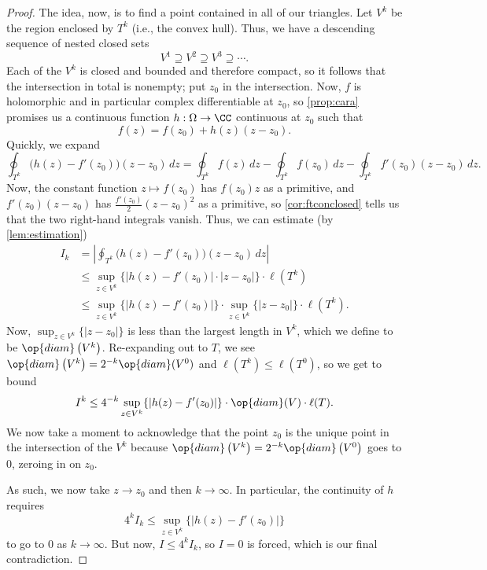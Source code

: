 \begin{proof}
	The idea, now, is to find a point contained in all of our triangles. Let $V^k$ be the region enclosed by $T^k$ (i.e., the convex hull). Thus, we have a descending sequence of nested closed sets
	\[V^1\supseteq V^2\supseteq V^3\supseteq\cdots.\]
	Each of the $V^k$ is closed and bounded and therefore compact, so it follows that %
	the intersection in total is nonempty; put $z_0$ in the intersection. Now, $f$ is holomorphic and in particular complex differentiable at $z_0$, so \autoref{prop:cara} promises us a continuous function $h:\Omega\to\CC$ continuous at $z_0$ such that
	\[f(z)=f(z_0)+h(z)(z-z_0).\]
	Quickly, we expand
	\[\oint_{T^k}\big(h(z)-f'(z_0)\big)(z-z_0)\,dz=\oint_{T^k}f(z)\,dz-\oint_{T^k}f(z_0)\,dz-\oint_{T^k}f'(z_0)(z-z_0)\,dz.\]
	Now, the constant function $z\mapsto f(z_0)$ has $f(z_0)z$ as a primitive, and $f'(z_0)(z-z_0)$ has $\frac{f'(z_0)}2(z-z_0)^2$ as a primitive, so \autoref{cor:ftconclosed} tells us that the two right-hand integrals vanish. Thus, we can estimate (by \autoref{lem:estimation})
	\begin{align*}
		I_k &= \left|\oint_{T^k}\big(h(z)-f'(z_0)\big)(z-z_0)\,dz\right| \\
		&\le \sup_{z\in V^k}\{|h(z)-f'(z_0)|\cdot|z-z_0|\}\cdot\ell\left(T^k\right) \\
		&\le \sup_{z\in V^k}\{|h(z)-f'(z_0)|\} \cdot\sup_{z\in V^k}\{|z-z_0|\}\cdot\ell\left(T^k\right).
	\end{align*}
	Now, $\sup_{z\in V^k}\{|z-z_0|\}$ is less than the largest length in $V^k$, which we define to be $\op{diam}\left(V^k\right)$. Re-expanding out to $T$, we see $\op{diam}\left(V^k\right)=2^{-k}\op{diam}(V^0)$ and $\ell\left(T^k\right)\le\ell(T^0)$, so we get to bound
	\[I^k\le 4^{-k}\sup_{z\in V^k}\{|h(z)-f'(z_0)|\}\cdot\op{diam}(V)\cdot\ell(T).\]
	We now take a moment to acknowledge that the point $z_0$ is the unique point in the intersection of the $V^k$ because $\op{diam}\left(V^k\right)=2^{-k}\op{diam}\left(V^0\right)$ goes to $0$, zeroing in on $z_0$.

	As such, we now take $z\to z_0$ and then $k\to\infty$. In particular, the continuity of $h$ requires
	\[4^kI_k\le\sup_{z\in V^k}\{|h(z)-f'(z_0)|\}\]
	to go to $0$ as $k\to\infty$. But now, $I\le 4^kI_k$, so $I=0$ is forced, which is our final contradiction.
\end{proof}

